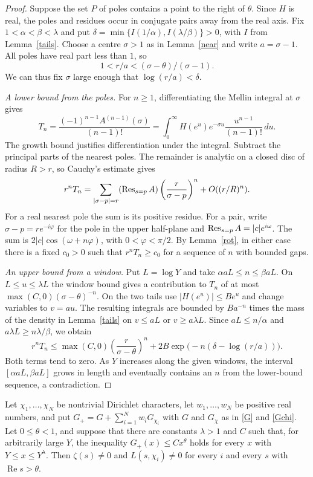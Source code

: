 \begin{proof}
Suppose the set $P$ of poles contains a point to the right of $\theta$.
Since $H$ is real, the poles and residues occur in conjugate pairs
away from the real axis. Fix $1<\alpha<\beta<\lambda$ and put
$\delta=\min\{I(1/\alpha),I(\lambda/\beta)\}>0$, with $I$ from
Lemma~\ref{tails}. Choose a centre $\sigma>1$ as in Lemma~\ref{near}
and write $a=\sigma-1$. All poles have real part less than $1$, so
\[
  1<r/a<(\sigma-\theta)/(\sigma-1).
\]
We can thus fix $\sigma$ large enough that $\log(r/a)<\delta$.

\emph{A lower bound from the poles.}
For $n\ge1$, differentiating the Mellin integral at $\sigma$ gives
\[
 T_n=\frac{(-1)^{n-1}A^{(n-1)}(\sigma)}{(n-1)!}
     =\int_0^\infty H(e^u)e^{-\sigma u}\frac{u^{n-1}}{(n-1)!}\,du .
\]
The growth bound justifies differentiation under the integral.
Subtract the principal parts of the nearest poles. The remainder is
analytic on a closed disc of radius $R>r$, so Cauchy's estimate gives
\[
 r^n T_n=\sum_{|\sigma-p|=r}
   (\operatorname{Res}_{s=p} A)\left(\frac r{\sigma-p}\right)^n+O((r/R)^n).
\]
For a real nearest pole the sum is its positive residue. For a pair, write
$\sigma-p=re^{-i\varphi}$ for the pole in the upper half-plane and
$\operatorname{Res}_{s=p}A=|c|e^{i\omega}$. The sum is
$2|c|\cos(\omega+n\varphi)$, with $0<\varphi<\pi/2$.
By Lemma~\ref{rot}, in either case there is a fixed $c_0>0$ such that
$r^n T_n\ge c_0$ for a sequence of $n$ with bounded gaps.

\emph{An upper bound from a window.}
Put $L=\log Y$ and take $\alpha aL\le n\le\beta aL$. On
$L\le u\le\lambda L$ the window bound gives a contribution to $T_n$
of at most $\max(C,0)(\sigma-\theta)^{-n}$.
On the two tails use $|H(e^u)|\le Be^u$ and change variables to $v=au$.
The resulting integrals are bounded by $Ba^{-n}$ times the mass of the
density in Lemma~\ref{tails} on $v\le aL$ or $v\ge a\lambda L$.
Since $aL\le n/\alpha$ and $a\lambda L\ge n\lambda/\beta$, we obtain
\[
 r^n T_n\le \max(C,0)\left(\frac r{\sigma-\theta}\right)^n
             +2B\exp\bigl(-n(\delta-\log(r/a))\bigr).
\]
Both terms tend to zero. As $Y$ increases along the given windows,
the interval $[\alpha aL,\beta aL]$ grows in length and eventually
contains an $n$ from the lower-bound sequence, a contradiction.
\end{proof}

\begin{corollary}\label{corA}
Let $\chi_1,\dots,\chi_N$ be nontrivial Dirichlet characters, let $w_1,\dots,w_N$ be positive real numbers, and put $G_+=G+\sum_{i=1}^Nw_iG_{\chi_i}$ with $G$ and $G_\chi$ as in \eqref{G} and \eqref{Gchi}. Let $0\le\theta<1$, and suppose that there are constants $\lambda>1$ and $C$ such that, for arbitrarily large $Y$, the inequality $G_+(x)\le Cx^\theta$ holds for every $x$ with $Y\le x\le Y^\lambda$. Then $\zeta(s)\ne0$ and $L(s,\chi_i)\ne0$ for every $i$ and every $s$ with $\operatorname{Re}s>\theta$.
\end{corollary}

